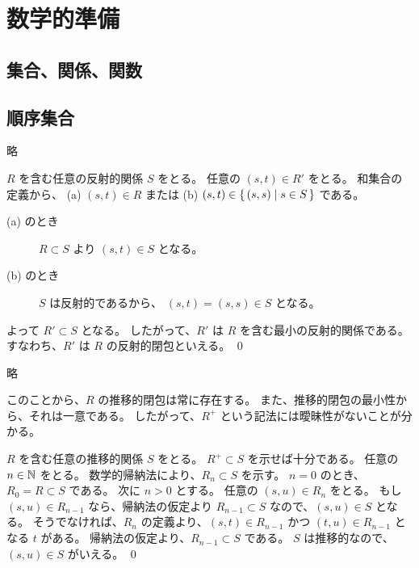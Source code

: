 \chapter{数学的準備}

\section{集合、関係、関数}

\section{順序集合}

\begin{jexercise*}[2.2.6]
  略
\end{jexercise*}
\begin{jproof}
  $R$ を含む任意の反射的関係 $S$ をとる。
  任意の $(s, t) \in R'$ をとる。
  和集合の定義から、
    (a) $(s, t) \in R$ または
    (b) $(s, t) \in \{\,(s, s) \mid s \in S\,\}$
    である。
  \begin{description}
    \item[(a) のとき]
      $R \subset S$ より $(s, t) \in S$ となる。
    \item[(b) のとき]
      $S$ は反射的であるから、 $(s, t) = (s, s) \in S$ となる。
  \end{description}
  よって $R' \subset S$ となる。
  したがって、$R'$ は $R$ を含む最小の反射的関係である。
  すなわち、$R'$ は $R$ の反射的閉包といえる。
  \qed
\end{jproof}

\begin{jexercise*}[2.2.7]
  略
\end{jexercise*}
\begin{jremark*}
  このことから、$R$ の推移的閉包は常に存在する。
  また、推移的閉包の最小性から、それは一意である。
  したがって、$R^+$ という記法には曖昧性がないことが分かる。
\end{jremark*}
\begin{jproof}
  $R$ を含む任意の推移的関係 $S$ をとる。
  $R^+ \subset S$ を示せば十分である。
  任意の $n \in \mathbb{N}$ をとる。
  数学的帰納法により、$R_n \subset S$ を示す。
  $n = 0$ のとき、$R_0 = R \subset S$ である。
  次に $n > 0$ とする。
  任意の $(s, u) \in R_n$ をとる。
  もし $(s, u) \in R_{n-1}$ なら、帰納法の仮定より $R_{n-1} \subset S$ なので、$(s, u) \in S$ となる。
  そうでなければ、$R_n$ の定義より、$(s, t) \in R_{n - 1}$ かつ $(t, u) \in R_{n - 1}$ となる $t$ がある。
  帰納法の仮定より、$R_{n - 1} \subset S$ である。
  $S$ は推移的なので、$(s, u) \in S$ がいえる。
  \qed
\end{jproof}

